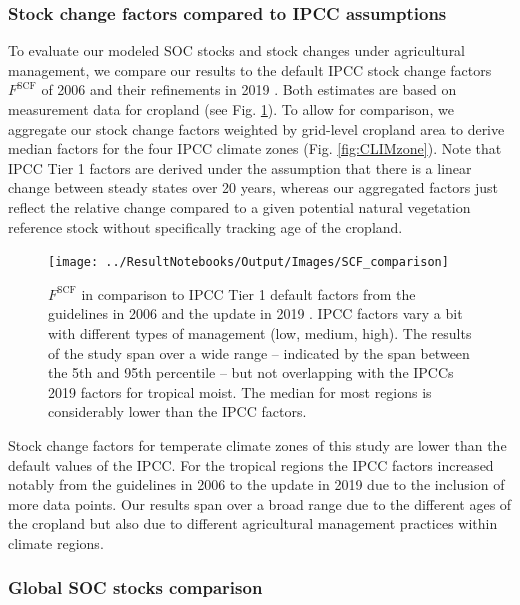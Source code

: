 \documentclass[gc, manuscript]{copernicus}
\begin{document}
\hypertarget{sec:ipcccompare}{%
\subsubsection{Stock change factors compared to IPCC assumptions}\label{sec:ipcccompare}}

To evaluate our modeled SOC stocks and stock changes under agricultural management, we compare our results to the default IPCC stock change factors \(F^{\mathrm{SCF}}\) of 2006 \citep{lasco_cropland_in_ipcc_2006} and their refinements in 2019 \citep{ogle_cropland_in_ipcc_2019}. Both estimates are based on measurement data for cropland (see Fig. \ref{fig:SCFglo}). To allow for comparison, we aggregate our stock change factors weighted by grid-level cropland area to derive median factors for the four IPCC climate zones (Fig. \ref{fig:CLIMzone}). Note that IPCC Tier 1 factors are derived under the assumption that there is a linear change between steady states over 20 years, whereas our aggregated factors just reflect the relative change compared to a given potential natural vegetation reference stock without specifically tracking age of the cropland.

\begin{figure}[h]
\texttt{[image: ../ResultNotebooks/Output/Images/SCF\_comparison]} \caption{$F^{\mathrm{SCF}}$ in comparison to IPCC Tier 1 default factors from the guidelines in 2006 \citep{lasco_cropland_in_ipcc_2006} and the update in 2019 \citep{ogle_cropland_in_ipcc_2019}. IPCC factors vary a bit with different types of management (low, medium, high). The results of the study span over a wide range -- indicated by the span between the 5th and 95th percentile -- but not overlapping with the IPCCs 2019 factors for tropical moist. The median for most regions is considerably lower than the IPCC factors.}\label{fig:SCFglo}
\end{figure}

Stock change factors for temperate climate zones of this study are lower than the default values of the IPCC. For the tropical regions the IPCC factors increased notably from the guidelines in 2006 \citep{lasco_cropland_in_ipcc_2006} to the update in 2019 \citep{ogle_cropland_in_ipcc_2019} due to the inclusion of more data points. Our results span over a broad range due to the different ages of the cropland but also due to different agricultural management practices within climate regions.

\hypertarget{global-soc-stocks-comparison}{%
\subsubsection{Global SOC stocks comparison}\label{global-soc-stocks-comparison}}
\end{document}
